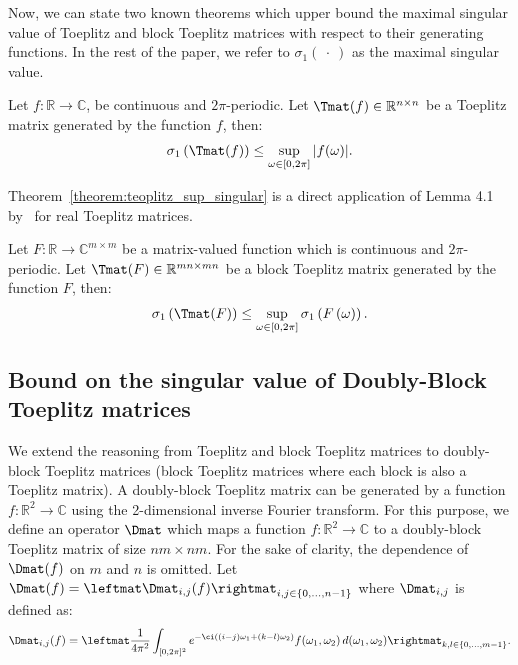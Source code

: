 Now, we can state two known theorems which upper bound the maximal singular value of Toeplitz and block Toeplitz matrices with respect to their generating functions.
In the rest of the paper, we refer to $\sigma_1(\ \cdot\ )$ as the maximal singular value. 

\begin{theorem} \label{theorem:teoplitz_sup_singular}
Let $f: \mathbb{R} \rightarrow \mathbb{C}$, be continuous and $2\pi$-periodic. Let $\Tmat(f) \in \mathbb{R}^{n \times n}$ be a Toeplitz matrix generated by the function $f$, then:
\begin{align}
  \sigma_1 \left( \Tmat(f) \right) \leq \sup_{\omega \in [0, 2\pi]} |f(\omega)|.
\end{align}
\end{theorem}

Theorem~\ref{theorem:teoplitz_sup_singular} is a direct application of  Lemma 4.1 by~\citet{gray2006toeplitz} for real Toeplitz matrices. 
\begin{theorem} \label{theorem:block_teoplitz_sup_singular}
Let $F: \mathbb{R} \rightarrow \mathbb{C}^{m \times m}$ be a matrix-valued function which is continuous and $2 \pi$-periodic.
Let $\Tmat(F) \in \mathbb{R}^{mn \times mn}$ be a block Toeplitz matrix generated by the function $F$, then:
\begin{align}
  \sigma_1 \left( \Tmat(F) \right) \leq \sup_{\omega \in [0, 2\pi]} \sigma_1 \left( F\left( \omega \right) \right) .
\end{align}
\end{theorem}

\subsection{Bound on the singular value of Doubly-Block Toeplitz matrices}
\label{section:bound_singular_value_doubly_block_toeplitz}

We extend the reasoning from Toeplitz and block Toeplitz matrices to doubly-block Toeplitz matrices (\ie block Toeplitz matrices where each block is also a Toeplitz matrix).
A doubly-block Toeplitz matrix can be generated by a function $f: \mathbb{R}^2 \rightarrow \mathbb{C}$ using the 2-dimensional inverse Fourier transform.
For this purpose, we define an operator $\Dmat$ which maps a function $f: \mathbb{R}^2 \rightarrow \mathbb{C}$ to a doubly-block Toeplitz matrix of size $nm \times nm$.
For the sake of clarity, the dependence of $\Dmat(f)$  on $m$ and $n$ is omitted.
Let $\Dmat(f) =\leftmat\Dmat_{i,j}(f)\rightmat_{i,j\in\{0,\ldots ,n-1\}}$ where $\Dmat_{i,j}$ is defined as:
\begin{equation} \label{equation:doubly_block_toeplitz_operator}
  \Dmat_{i,j}(f) = \leftmat \frac{1}{4\pi^{2}} \int_{[0,2\pi]^{2}} e^{- \ci \left((i-j)\omega_{1}+(k-l)\omega_{2}\right)}f(\omega_{1},\omega_{2})\,d(\omega_{1},\omega_{2}) \rightmat_{k,l\in\{0,\ldots,m-1\}} .
\end{equation}

